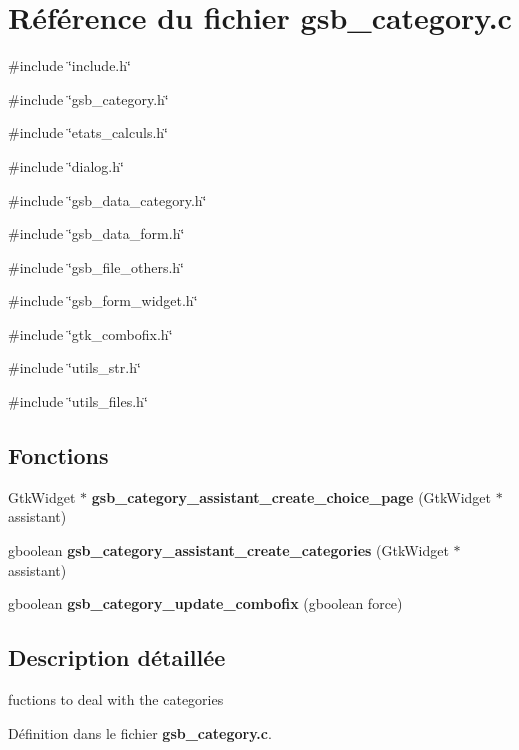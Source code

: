 \section{Référence du fichier gsb\_\-category.c}
\label{gsb__category_8c}
{\ttfamily \#include \char`\"{}include.h\char`\"{}}\par
{\ttfamily \#include \char`\"{}gsb\_\-category.h\char`\"{}}\par
{\ttfamily \#include \char`\"{}etats\_\-calculs.h\char`\"{}}\par
{\ttfamily \#include \char`\"{}dialog.h\char`\"{}}\par
{\ttfamily \#include \char`\"{}gsb\_\-data\_\-category.h\char`\"{}}\par
{\ttfamily \#include \char`\"{}gsb\_\-data\_\-form.h\char`\"{}}\par
{\ttfamily \#include \char`\"{}gsb\_\-file\_\-others.h\char`\"{}}\par
{\ttfamily \#include \char`\"{}gsb\_\-form\_\-widget.h\char`\"{}}\par
{\ttfamily \#include \char`\"{}gtk\_\-combofix.h\char`\"{}}\par
{\ttfamily \#include \char`\"{}utils\_\-str.h\char`\"{}}\par
{\ttfamily \#include \char`\"{}utils\_\-files.h\char`\"{}}\par
\subsection*{Fonctions}
\begin{DoxyCompactItemize}
\item 
GtkWidget $\ast$ {\bf gsb\_\-category\_\-assistant\_\-create\_\-choice\_\-page} (GtkWidget $\ast$assistant)
\item 
gboolean {\bf gsb\_\-category\_\-assistant\_\-create\_\-categories} (GtkWidget $\ast$assistant)
\item 
gboolean {\bf gsb\_\-category\_\-update\_\-combofix} (gboolean force)
\end{DoxyCompactItemize}


\subsection{Description détaillée}
fuctions to deal with the categories 

Définition dans le fichier {\bf gsb\_\-category.c}.



